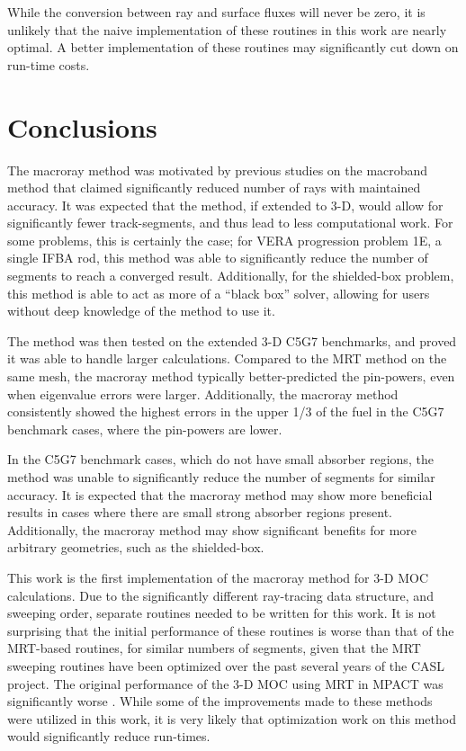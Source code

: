 {{    While the conversion between ray and surface fluxes will never be zero, it is unlikely that the naive implementation of these routines in this work are nearly optimal.
    A better implementation of these routines may significantly cut down on run-time costs.
  }


  \section{Conclusions}{\label{sec:MR:Conclusions}
    The macroray method was motivated by previous studies on the macroband method that claimed significantly reduced number of rays with maintained accuracy.
    It was expected that the method, if extended to 3-D, would allow for significantly fewer track-segments, and thus lead to less computational work.
    For some problems, this is certainly the case; for \ac{VERA} progression problem 1E, a single \ac{IFBA} rod, this method was able to significantly reduce the number of segments to reach a converged result.
    Additionally, for the shielded-box problem, this method is able to act as more of a ``black box'' solver, allowing for users without deep knowledge of the method to use it.

    The method was then tested on the extended 3-D C5G7 benchmarks, and proved it was able to handle larger calculations.
    Compared to the \ac{MRT} method on the same mesh, the macroray method typically better-predicted the pin-powers, even when eigenvalue errors were larger.
    Additionally, the macroray method consistently showed the highest errors in the upper 1/3 of the fuel in the C5G7 benchmark cases, where the pin-powers are lower.

    In the C5G7 benchmark cases, which do not have small absorber regions, the method was unable to significantly reduce the number of segments for similar accuracy.
    It is expected that the macroray method may show more beneficial results in cases where there are small strong absorber regions present.
    Additionally, the macroray method may show significant benefits for more arbitrary geometries, such as the shielded-box.

    This work is the first implementation of the macroray method for 3-D \ac{MOC} calculations.
    Due to the significantly different ray-tracing data structure, and sweeping order, separate routines needed to be written for this work.
    It is not surprising that the initial performance of these routines is worse than that of the \ac{MRT}-based routines, for similar numbers of segments, given that the \ac{MRT} sweeping routines have been optimized over the past several years of the \ac{CASL} project.
    The original performance of the 3-D \ac{MOC} using \ac{MRT} in MPACT was significantly worse \cite{Kochunas2013}.
    While some of the improvements made to these methods were utilized in this work, it is very likely that optimization work on this method would significantly reduce run-times.
  }
  \printbibliography
}